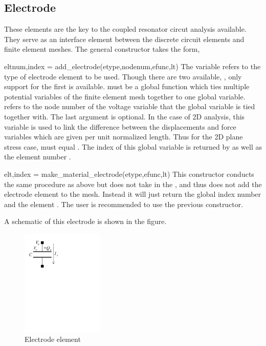 \clearpage
\subsection{Electrode}
These elements are the key to the coupled resonator circut analysis 
available. They serve as an interface element between the discrete circuit
elements and finite element meshes.
The general constructor takes the form,
\begin{codelist}

  \item[eltnum,index = add\_electrode(etype,nodenum,efunc,lt)]
  The variable  refers to the type of electrode
  element to be used. Though there are two available,
  , only support for the first is
  available.  must be a global function which ties
  multiple potential variables of the finite element mesh together
  to one global variable.  refers to the node number 
  of the voltage variable that the global variable is tied together 
  with. The last argument  is optional. In the case of 2D
  analysis, this variable is used to link the difference between the
  displacements and force variables which are given per unit normalized
  length. Thus for the 2D plane stress case,  must equal
  . The index of this 
  global variable is returned by  as well as the element 
  number .

  \item[elt,index = make\_material\_electrode(etype,efunc,lt)]
  This constructor conducts the same procedure as above but does
  not take in the , and thus does not add the electrode
  element to the mesh. Instead it will just return the global
  index number  and the element . The user
  is recommended to use the previous constructor. 
  
\end{codelist}
A schematic of this electrode is shown in the figure.
\begin{figure}[htbp]
  \centering
  \includegraphics[trim = 0in 7in 4.5in 0in, clip, height=2in]{fig/electrode.pdf}
  \caption{Electrode element}
  \label{fig:Electrode_Element}
\end{figure}
